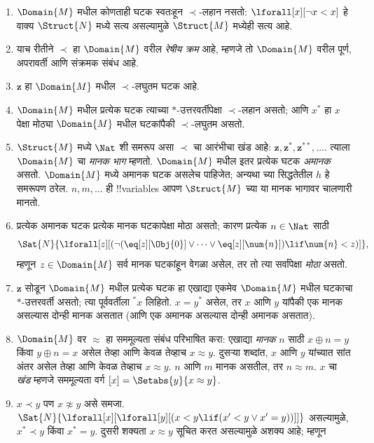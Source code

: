 \documentclass[../../../include/open-logic-section]{subfiles}
\begin{document}
\begin{enumerate}
\item $\Domain{M}$ मधील कोणताही घटक स्वतःहून $\prec$-लहान
  नसतो: $\lforall[x][\lnot x < x]$ हे वाक्य $\Struct{N}$
  मध्ये सत्य असल्यामुळे $\Struct{M}$ मध्येही सत्य आहे.
\item याच रीतीने $\prec$ हा $\Domain{M}$ वरील
  \emph{रेषीय क्रम} आहे, म्हणजे तो $\Domain{M}$ वरील
  पूर्ण, अपरावर्ती आणि संक्रमक संबंध आहे.
\item $\mathbf{z}$ हा $\Domain{M}$ मधील $\prec$-लघुतम घटक आहे.
\item $\Domain{M}$ मधील प्रत्येक घटक त्याच्या $*$-उत्तरवर्तीपेक्षा
  $\prec$-लहान असतो; आणि $x^*$ हा $x$ पेक्षा मोठ्या
  $\Domain{M}$ मधील घटकांपैकी $\prec$-लघुतम असतो.
\item $\Struct{M}$ मध्ये $\Nat$ शी समरूप असा $\prec$ चा
  आरंभीचा खंड आहे: $\mathbf{z}, \mathbf{z}^*,
  \mathbf{z}^{**}, \dots$. त्याला $\Domain{M}$ चा
  \emph{मानक भाग} म्हणतो. $\Domain{M}$ मधील इतर प्रत्येक
  घटक \emph{अमानक} असतो. $\Domain{M}$ मध्ये अमानक
  घटक असलेच पाहिजेत;
  अन्यथा  च्या सिद्धतेतील $h$ हे
  समरूपण ठरेल. $n, m, \dots$ ही !!{variable}s आपण
  $\Struct{M}$ च्या या मानक भागावर चालणारी मानतो.
\item प्रत्येक अमानक घटक प्रत्येक मानक घटकापेक्षा मोठा
  असतो; कारण प्रत्येक $n \in \Nat$ साठी
  \[
  \Sat{N}{\lforall[z][(\lnot(\eq[z][\Obj{0}] \lor
  \dots \lor \eq[z][\num{n}]) \lif \num{n} < z)]},
  \]
  म्हणून $z \in \Domain{M}$ सर्व मानक घटकांहून
  वेगळा असेल, तर तो त्या सर्वांपेक्षा \emph{मोठा} असतो.
\item $\mathbf{z}$ सोडून $\Domain{M}$ मधील प्रत्येक
  घटक हा एखाद्या एकमेव $\Domain{M}$ मधील घटकाचा
  $*$-उत्तरवर्ती असतो; त्या पूर्ववर्तीला $^*x$ लिहितो.
  $x = y^*$ असेल, तर $x$ आणि $y$ यांपैकी एक मानक
  असल्यास दोन्ही मानक असतात (आणि एक अमानक असल्यास
  दोन्ही अमानक असतात).
\item $\Domain{M}$ वर $\approx$ हा सममूल्यता संबंध
  परिभाषित करा: एखाद्या \emph{मानक} $n$ साठी
  $x \oplus n = y$ किंवा $y \oplus n =x$
  असेल तेव्हा आणि केवळ तेव्हाच $x \approx y$.
  दुसऱ्या शब्दांत, $x$ आणि $y$ यांच्यात सांत अंतर
  असेल तेव्हा आणि केवळ तेव्हाच $x \approx y$.
  $n$ आणि $m$ मानक असतील, तर $n \approx m$.
  $x$ चा \emph{खंड} म्हणजे सममूल्यता वर्ग
  $[x] = \Setabs{y}{x \approx y}$.
\item $x \prec y$ पण $x \not\approx y$ असे समजा.
  $\Sat{N}{\lforall[x][\lforall[y][(x < y \lif (x' < y \lor x' =
      y))]]}$ असल्यामुळे, $x^* \prec y$ किंवा
  $x^* = y$. दुसरी शक्यता $x \approx y$ सूचित
  करत असल्यामुळे अशक्य आहे; म्हणून

\end{enumerate}
\end{document}
